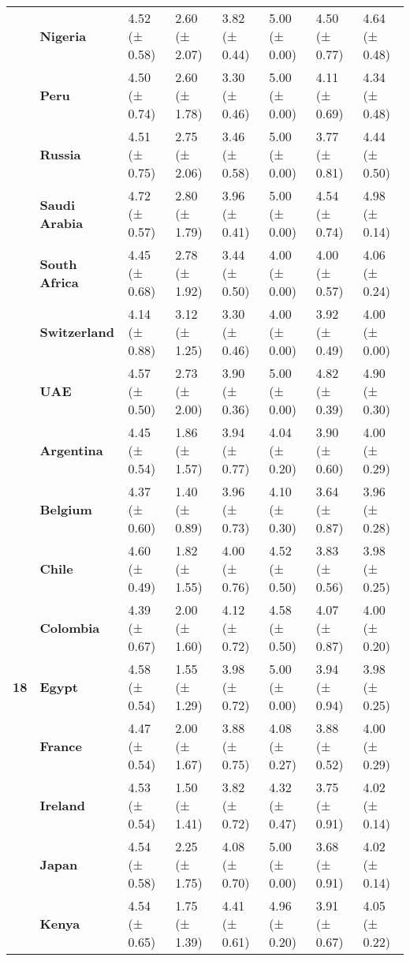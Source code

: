 \begin{longtable}{llllllll}
\textbf{} & \textbf{Nigeria} & 4.52 (± 0.58) & 2.60 (± 2.07) & 3.82 (± 0.44) & 5.00 (± 0.00) & 4.50 (± 0.77) & 4.64 (± 0.48) \\
\textbf{} & \textbf{Peru} & 4.50 (± 0.74) & 2.60 (± 1.78) & 3.30 (± 0.46) & 5.00 (± 0.00) & 4.11 (± 0.69) & 4.34 (± 0.48) \\
\textbf{} & \textbf{Russia} & 4.51 (± 0.75) & 2.75 (± 2.06) & 3.46 (± 0.58) & 5.00 (± 0.00) & 3.77 (± 0.81) & 4.44 (± 0.50) \\
\textbf{} & \textbf{Saudi Arabia} & 4.72 (± 0.57) & 2.80 (± 1.79) & 3.96 (± 0.41) & 5.00 (± 0.00) & 4.54 (± 0.74) & 4.98 (± 0.14) \\
\textbf{} & \textbf{South Africa} & 4.45 (± 0.68) & 2.78 (± 1.92) & 3.44 (± 0.50) & 4.00 (± 0.00) & 4.00 (± 0.57) & 4.06 (± 0.24) \\
\textbf{} & \textbf{Switzerland} & 4.14 (± 0.88) & 3.12 (± 1.25) & 3.30 (± 0.46) & 4.00 (± 0.00) & 3.92 (± 0.49) & 4.00 (± 0.00) \\
\textbf{} & \textbf{UAE} & 4.57 (± 0.50) & 2.73 (± 2.00) & 3.90 (± 0.36) & 5.00 (± 0.00) & 4.82 (± 0.39) & 4.90 (± 0.30) \\
\cline{1-8}
\multirow[t]{19}{*}{\textbf{18}} & \textbf{Argentina} & 4.45 (± 0.54) & 1.86 (± 1.57) & 3.94 (± 0.77) & 4.04 (± 0.20) & 3.90 (± 0.60) & 4.00 (± 0.29) \\
\textbf{} & \textbf{Belgium} & 4.37 (± 0.60) & 1.40 (± 0.89) & 3.96 (± 0.73) & 4.10 (± 0.30) & 3.64 (± 0.87) & 3.96 (± 0.28) \\
\textbf{} & \textbf{Chile} & 4.60 (± 0.49) & 1.82 (± 1.55) & 4.00 (± 0.76) & 4.52 (± 0.50) & 3.83 (± 0.56) & 3.98 (± 0.25) \\
\textbf{} & \textbf{Colombia} & 4.39 (± 0.67) & 2.00 (± 1.60) & 4.12 (± 0.72) & 4.58 (± 0.50) & 4.07 (± 0.87) & 4.00 (± 0.20) \\
\textbf{} & \textbf{Egypt} & 4.58 (± 0.54) & 1.55 (± 1.29) & 3.98 (± 0.72) & 5.00 (± 0.00) & 3.94 (± 0.94) & 3.98 (± 0.25) \\
\textbf{} & \textbf{France} & 4.47 (± 0.54) & 2.00 (± 1.67) & 3.88 (± 0.75) & 4.08 (± 0.27) & 3.88 (± 0.52) & 4.00 (± 0.29) \\
\textbf{} & \textbf{Ireland} & 4.53 (± 0.54) & 1.50 (± 1.41) & 3.82 (± 0.72) & 4.32 (± 0.47) & 3.75 (± 0.91) & 4.02 (± 0.14) \\
\textbf{} & \textbf{Japan} & 4.54 (± 0.58) & 2.25 (± 1.75) & 4.08 (± 0.70) & 5.00 (± 0.00) & 3.68 (± 0.91) & 4.02 (± 0.14) \\
\textbf{} & \textbf{Kenya} & 4.54 (± 0.65) & 1.75 (± 1.39) & 4.41 (± 0.61) & 4.96 (± 0.20) & 3.91 (± 0.67) & 4.05 (± 0.22) \\

\end{longtable}

